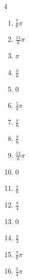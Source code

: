 \begin{multicols}{4}
\begin{enumerate}
  \item $\displaystyle \frac{7}{6}\pi$

  \item $\displaystyle \frac{11}{6}\pi$

  \item $\displaystyle \pi$

  \item $\displaystyle \frac{\pi}{6}$

  \item $\displaystyle 0$

  \item $\displaystyle \frac{5}{4}\pi$

  \item $\displaystyle \frac{\pi}{6}$

  \item $\displaystyle \frac{\pi}{6}$

  \item $\displaystyle \frac{11}{6}\pi$

  \item $\displaystyle 0$

  \item $\displaystyle \frac{\pi}{6}$

  \item $\displaystyle \frac{\pi}{4}$

  \item $\displaystyle 0$

  \item $\displaystyle \frac{\pi}{2}$

  \item $\displaystyle \frac{7}{6}\pi$

  \item $\displaystyle \frac{5}{4}\pi$


\end{enumerate}
\end{multicols}
